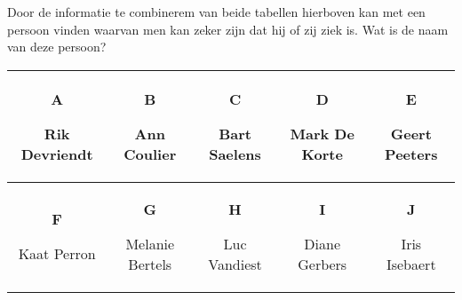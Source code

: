 \documentclass[12pt, a4paper]{article}
\begin{document}
\begin{minipage}{\textwidth}
			Door de informatie te combinerem van beide tabellen hierboven kan met een persoon vinden waarvan men kan zeker zijn dat hij of zij ziek is. Wat is de naam van deze persoon?

			\begin{table}[H]
				\centering 
				\begin{tabulary}{\linewidth}{|C|C|C|C|C|}
					\hline
					\textbf{A} \vspace{0.1cm}
					
					Rik Devriendt
					&
					\textbf{B} \vspace{0.1cm}
					
					Ann Coulier	
					&
					\textbf{C} \vspace{0.1cm}
					
					Bart Saelens	
					&
					\textbf{D} \vspace{0.1cm}
					
					Mark De Korte	
					&
					\textbf{E} \vspace{0.1cm}
					
					Geert Peeters
					\\ \hline
					\textbf{F} \vspace{0.1cm}
					
					Kaat Perron	
					&
					\textbf{G} \vspace{0.1cm}
					
					Melanie Bertels	
					&
					\textbf{H} \vspace{0.1cm}
					
					Luc Vandiest	
					&
					\textbf{I} \vspace{0.1cm}
					
					Diane Gerbers	
					&
					\textbf{J} \vspace{0.1cm}
					
					Iris Isebaert
					\\ \hline
				\end{tabulary}
			\end{table}

	\end{minipage}
		
\end{document}

